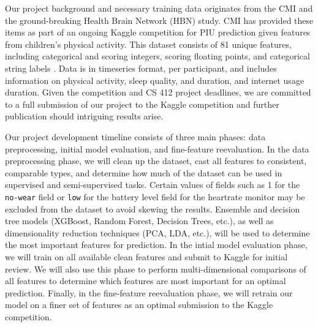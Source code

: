 \documentclass[11pt]{extarticle}
\begin{document}
Our project background and necessary training data originates from the CMI and the ground-breaking Health Brain Network (HBN) study.
CMI has provided these items as part of an ongoing Kaggle competition for PIU prediction given features from children's physical activity. 
This dataset consists of 81 unique features, including categorical and scoring integers, scoring floating points, and categorical string labels \cite{child-mind-institute-problematic-internet-use}.
Data is in timeseries format, per participant, and includes information on physical activity, sleep quality, and duration, and internet usage duration.
Given the competition and CS 412 project deadlines, we are committed to a full submission of our project to the Kaggle competition and further publication should intriguing results arise.


Our project development timeline consists of three main phases: data preprocessing, initial model evaluation, and fine-feature reevaluation.
In the data preprocessing phase, we will clean up the dataset, cast all features to consistent, comparable types, and determine how much of the dataset can be used in supervised and semi-supervised tasks. Certain values of fields such as 1 for the \texttt{no-wear} field or \texttt{low} for the battery level field for the heartrate monitor may be excluded from the dataset to avoid skewing the results.
Ensemble and decision tree models (XGBoost, Random Forest, Decision Trees, etc.), as well as dimensionality reduction techniques (PCA, LDA, etc.), will be used to determine the most important features for prediction.
In the intial model evaluation phase, we will train on all available clean features and submit to Kaggle for initial review. 
We will also use this phase to perform multi-dimensional comparisons of all features to determine which features are most important for an optimal prediction.
Finally, in the fine-feature reevaluation phase, we will retrain our model on a finer set of features as an optimal submission to the Kaggle competition.



\end{document}
